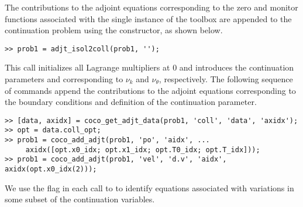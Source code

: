The contributions to the adjoint equations corresponding to the zero and monitor functions associated with the single instance of the  toolbox are appended to the continuation problem using the  constructor, as shown below.
\begin{lstlisting}[language=coco-highlight]
>> prob1 = adjt_isol2coll(prob1, '');
\end{lstlisting}
This call initializes all Lagrange multipliers at $0$ and introduces the continuation parameters  and  corresponding to $\nu_k$ and $\nu_\theta$, respectively. The following sequence of commands append the contributions to the adjoint equations corresponding to the boundary conditions and definition of the  continuation parameter.
\begin{lstlisting}[language=coco-highlight]
>> [data, axidx] = coco_get_adjt_data(prob1, 'coll', 'data', 'axidx');
>> opt = data.coll_opt;
>> prob1 = coco_add_adjt(prob1, 'po', 'aidx', ...
     axidx([opt.x0_idx; opt.x1_idx; opt.T0_idx; opt.T_idx]));
>> prob1 = coco_add_adjt(prob1, 'vel', 'd.v', 'aidx', axidx(opt.x0_idx(2)));
\end{lstlisting}
We use the  flag in each call to  to identify equations associated with variations in some subset of the continuation variables.

